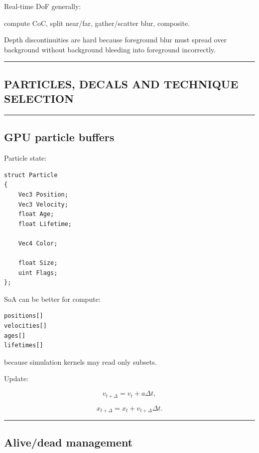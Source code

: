 Real-time DoF generally:

compute CoC, split near/far, gather/scatter blur, composite.

Depth discontinuities are hard because foreground blur must spread over background without background bleeding into foreground incorrectly.

\begin{center}\rule{0.5\linewidth}{0.5pt}\end{center}

\subsection{PARTICLES, DECALS AND TECHNIQUE SELECTION}\label{04-visual-computing-ii-ch040-particles-decals-and-technique-selection}

\begin{center}\rule{0.5\linewidth}{0.5pt}\end{center}

\subsection{GPU particle buffers}\label{04-visual-computing-ii-ch040-gpu-particle-buffers}

Particle state:

\begin{verbatim}
struct Particle
{
    Vec3 Position;
    Vec3 Velocity;
    float Age;
    float Lifetime;

    Vec4 Color;

    float Size;
    uint Flags;
};
\end{verbatim}

SoA can be better for compute:

\begin{verbatim}
positions[]
velocities[]
ages[]
lifetimes[]
\end{verbatim}

because simulation kernels may read only subsets.

Update:

\[
v_{t+\Delta}
=
v_t+a\Delta t,
\]

\[
x_{t+\Delta}
=
x_t+v_{t+\Delta}\Delta t.
\]

\begin{center}\rule{0.5\linewidth}{0.5pt}\end{center}

\subsection{Alive/dead management}\label{04-visual-computing-ii-ch040-alivedead-management}

